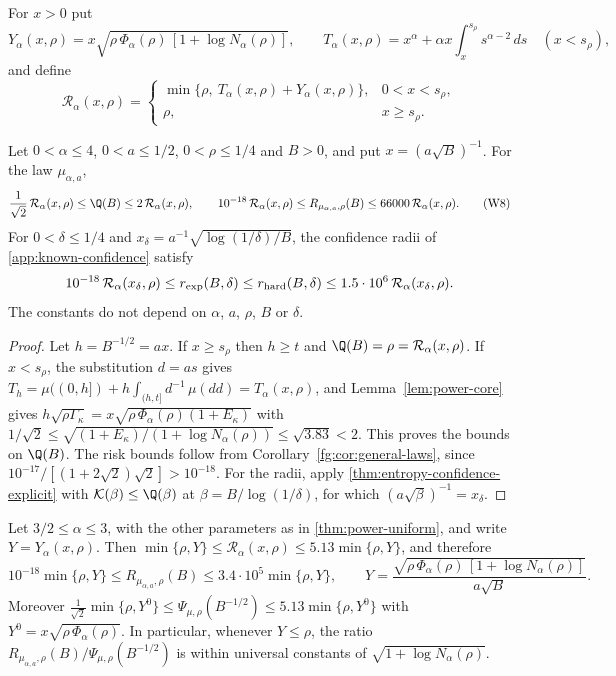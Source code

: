 For $x>0$ put
\[
 Y_\alpha(x,\rho)=x\sqrt{\rho\,\Phi_\alpha(\rho)\,[1+\log N_\alpha(\rho)]},
 \qquad
 T_\alpha(x,\rho)=x^\alpha+\alpha x\int_x^{s_\rho}s^{\alpha-2}\,ds\quad(x<s_\rho),
\]
and define
\[
 \mathcal R_\alpha(x,\rho)=
 \begin{cases}
  \min\{\rho,\ T_\alpha(x,\rho)+Y_\alpha(x,\rho)\},&0<x<s_\rho,\\
  \rho,&x\ge s_\rho .
 \end{cases}
 \tag{W7}\label{eq:power-uniform-rate}
\]

\begin{theorem}
\label{thm:power-uniform}
Let $0<\alpha\le4$, $0<a\le1/2$, $0<\rho\le1/4$ and $B>0$, and put
$x=(a\sqrt B)^{-1}$. For the law $\mu_{\alpha,a}$,
\[
 \frac1{\sqrt2}\,\mathcal R_\alpha(x,\rho)\le\Q(B)
 \le2\,\mathcal R_\alpha(x,\rho),
 \qquad
 10^{-18}\,\mathcal R_\alpha(x,\rho)\le R_{\mu_{\alpha,a},\rho}(B)
 \le66000\,\mathcal R_\alpha(x,\rho).
 \tag{W8}\label{eq:power-uniform}
\]
For $0<\delta\le1/4$ and $x_\delta=a^{-1}\sqrt{\log(1/\delta)/B}$, the
confidence radii of \cref{app:known-confidence} satisfy
\[
 10^{-18}\,\mathcal R_\alpha(x_\delta,\rho)\le r_{\rm exp}(B,\delta)
 \le r_{\rm hard}(B,\delta)
 \le1.5\cdot10^{6}\,\mathcal R_\alpha(x_\delta,\rho).
\]
The constants do not depend on $\alpha$, $a$, $\rho$, $B$ or $\delta$.
\end{theorem}

\begin{proof}
Let $h=B^{-1/2}=ax$. If $x\ge s_\rho$ then $h\ge t$ and
$\Q(B)=\rho=\mathcal R_\alpha(x,\rho)$. If $x<s_\rho$, the substitution
$d=as$ gives
$T_h=\mu((0,h])+h\int_{(h,t]}d^{-1}\,\mu(dd)=T_\alpha(x,\rho)$, and
Lemma~\ref{lem:power-core} gives
$h\sqrt{\rho\Gamma_\kappa}=x\sqrt{\rho\,\Phi_\alpha(\rho)(1+E_\kappa)}$
with $1/\sqrt2\le\sqrt{(1+E_\kappa)/(1+\log N_\alpha(\rho))}\le\sqrt{3.83}<2$.
This proves the bounds on $\Q(B)$. The risk bounds follow from
Corollary~\ref{fg:cor:general-laws}, since
$10^{-17}/[(1+2\sqrt2)\sqrt2]>10^{-18}$. For the radii, apply
\cref{thm:entropy-confidence-explicit} with
$\mathcal K(\beta)\le\Q(\beta)$ at $\beta=B/\log(1/\delta)$, for which
$(a\sqrt\beta)^{-1}=x_\delta$.
\end{proof}

\begin{corollary}\label{cor:critical-window}
Let $3/2\le\alpha\le3$, with the other parameters as in
\cref{thm:power-uniform}, and write $Y=Y_\alpha(x,\rho)$. Then
$\min\{\rho,Y\}\le\mathcal R_\alpha(x,\rho)\le5.13\min\{\rho,Y\}$, and
therefore
\[
 10^{-18}\min\{\rho,Y\}\le R_{\mu_{\alpha,a},\rho}(B)
 \le3.4\cdot10^{5}\min\{\rho,Y\},
 \qquad
 Y=\frac{\sqrt{\rho\,\Phi_\alpha(\rho)\,[1+\log N_\alpha(\rho)]}}{a\sqrt B}.
 \tag{W9}\label{eq:psi-window-critical}
\]
Moreover
$\tfrac1{\sqrt2}\min\{\rho,Y^0\}\le\Psi_{\mu,\rho}(B^{-1/2})
 \le5.13\min\{\rho,Y^0\}$ with
$Y^0=x\sqrt{\rho\,\Phi_\alpha(\rho)}$. In particular, whenever $Y\le\rho$,
the ratio $R_{\mu_{\alpha,a},\rho}(B)/\Psi_{\mu,\rho}(B^{-1/2})$ is
within universal constants of $\sqrt{1+\log N_\alpha(\rho)}$.
\end{corollary}

